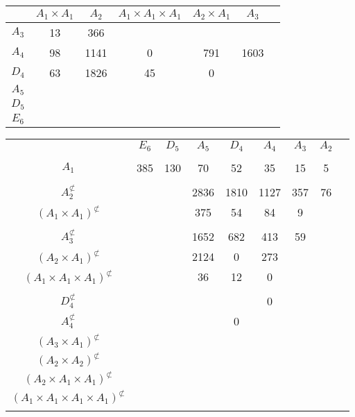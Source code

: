 \documentclass[12pt]{article}
\begin{document}
\begin{center}
\begin{tabular}{ c ||  c | c | c | c | c |  c |}
 & $A_1 \times A_1$ & $A_2$ & $A_1 \times A_1 \times A_1$ & $A_2 \times A_1$ & $A_3$  \\ \hline
\hline \( A_3 \) &13 & 366 & & &  \\ 
\hline \( A_4 \) & 98 & 1141 & 0 & 791 & 1603 \\ 
\hline \( D_4 \) & 63 & 1826 & 45 & 0 &  \\ 
\hline \( A_5 \) & & & & &  \\ 
\hline \( D_5 \) & & & & &  \\ 
\hline \( E_6 \) & & & & &  \\ 
\hline
\end{tabular}
\vspace{.6cm}

\begin{tabular}{ c ||  c | c | c | c | c |  c | c | c |}
 & $E_6$ & $D_5$ & $A_5$ & $D_4$ & $A_4$ & $A_3$ & $A_2$    \\ \cline{1-8} \\[-.44cm]
\cline{1-8} \(A_1 \) & 385 & 130 & 70 & 52 & 35 & 15 & 5  \\ \cline{1-8} \\[-.44cm]
\cline{1-8} \(A_2^{\not\subset} \) & & & 2836 & 1810 & 1127 & 357 & 76  \\ 
\cline{1-8} \((A_1 \times A_1)^{\not\subset} \)  & & & 375 & 54 & 84 & 9  \\ \cline{1-7} \\[-.44cm]
\cline{1-7} \(A_3^{\not\subset} \) & & & 1652 & 682 & 413 & 59 \\ 
\cline{1-7} \((A_2 \times A_1)^{\not\subset} \) & & & 2124 & 0 & 273 \\ 
\cline{1-6} \((A_1 \times A_1 \times A_1)^{\not\subset} \) & & & 36 & 12 & 0 \\  \cline{1-6} \\[-.44cm]
\cline{1-6} \(D_4^{\not\subset}\) & & & & & 0 \\ 
\cline{1-6} \(A_4^{\not\subset}\) & & & & 0 &  \\ 
\cline{1-6} \((A_3 \times A_1)^{\not\subset} \) & & &  \\ 
\cline{1-4} \((A_2 \times A_2)^{\not\subset} \) & & & \\ 
\cline{1-4} \((A_2 \times A_1 \times A_1)^{\not\subset} \) & & &  \\ 
\cline{1-4} \((A_1 \times A_1 \times A_1 \times A_1)^{\not\subset} \) & & &  \\  \cline{1-4} \\[-.44cm]

\end{tabular}
\end{center}
\end{document}
